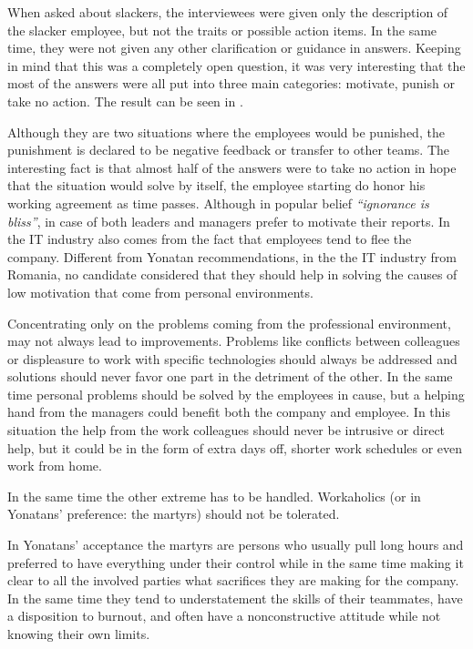 When asked about slackers, the interviewees were given only the description of the slacker employee, but not the traits or possible action items. In the same time, they were not given any other clarification or guidance in answers. Keeping in mind that this was a completely open question, it was very interesting that the most of the answers were all put into three main categories: motivate, punish or take no action. The result can be seen in .

Although they are two situations where the employees would be punished, the punishment is declared to be negative feedback or transfer to other teams.
The interesting fact is that almost half of the answers were to take no action in hope that the situation would solve by itself, the employee starting do honor his working agreement as time passes.
Although in popular belief \textit{``ignorance is bliss''}, in case of both leaders and managers prefer to motivate their reports. In the IT industry also comes from the fact that employees tend to flee the company. Different from Yonatan recommendations, in the the IT industry from Romania, no candidate considered that they should help in solving the causes of low motivation that come from personal environments. 

Concentrating only on the problems coming from the professional environment, may not always lead to improvements. Problems like conflicts between colleagues or displeasure to work with specific technologies should always be addressed and solutions should never favor one part in the detriment of the other. In the same time personal problems should be solved by the employees in cause, but a helping hand from the managers could benefit both the company and employee. In this situation the help from the work colleagues should never be intrusive or direct help, but it could be in the form of extra days off, shorter work schedules or even work from home.

In the same time the other extreme has to be handled. Workaholics (or in Yonatans' preference: the martyrs) should not be tolerated. 

In Yonatans' acceptance the martyrs are persons who usually pull long hours and preferred to have everything under their control while in the same time making it clear to all the involved parties what sacrifices they are making for the company. In the same time they tend to understatement the skills of their teammates, have a disposition to burnout, and often have a nonconstructive attitude while not knowing their own limits. 

